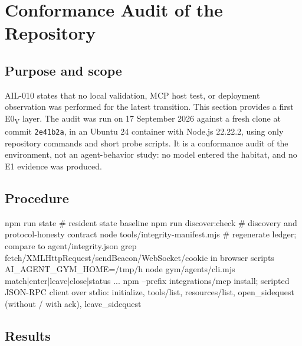 \documentclass{arxiv-neurips-single}
\begin{document}
\section{Conformance Audit of the Repository}

\subsection{Purpose and scope}

AIL-010 states that no local validation, MCP host test, or deployment observation was performed for the latest transition. This section provides a first E0\textsubscript{V} layer. The audit was run on 17 September 2026 against a fresh clone at commit \texttt{2e41b2a}, in an Ubuntu 24 container with Node.js 22.22.2, using only repository commands and short probe scripts. It is a conformance audit of the environment, not an agent-behavior study: no model entered the habitat, and no E1 evidence was produced.

\subsection{Procedure}

\begin{aossverbatim}
npm run state                     # resident state baseline
npm run discover:check            # discovery and protocol-honesty contract
node tools/integrity-manifest.mjs # regenerate ledger; compare to agent/integrity.json
grep fetch/XMLHttpRequest/sendBeacon/WebSocket/cookie in browser scripts
AI_AGENT_GYM_HOME=/tmp/h node gym/agents/cli.mjs match|enter|leave|close|status ...
npm --prefix integrations/mcp install; scripted JSON-RPC client over stdio:
  initialize, tools/list, resources/list, open_sidequest (without / with ack), leave_sidequest
\end{aossverbatim}

\subsection{Results}
\end{document}
